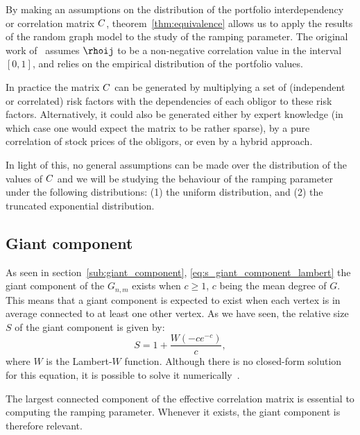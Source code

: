 \vspace{0.5cm}

By making an assumptions on the distribution of the portfolio interdependency or correlation matrix $C$, theorem~\vref{thm:equivalence} allows us to apply the results of the random graph model to the study of the ramping parameter.
The original work of~\cite{Sindel:2009vd} assumes $\rhoij$ to be a non-negative correlation value in the interval $[0,1]$, and relies on the empirical distribution of the portfolio values.

In practice the matrix $C$ can be generated by multiplying a set of (independent or correlated) risk factors with the dependencies of each obligor to these risk factors.
Alternatively, it could also be generated either by expert knowledge (in which case one would expect the matrix to be rather sparse), by a pure correlation of stock prices of the obligors, or even by a hybrid approach.

In light of this, no general assumptions can be made over the distribution of the values of $C$ and we will be studying the behaviour of the ramping parameter under the following distributions:
(1) the uniform distribution, and (2) the truncated exponential distribution.

\subsection{Giant component} %
\label{sub:giant_component}

As seen in section~\vref{sub:giant_component}, \vref{eq:s_giant_component_lambert} the giant component of the $G_{n,m}$ exists when $c \ge 1$, $c$ being the mean degree of $G$.
This means that a giant component is expected to exist when each vertex is in average connected to at least one other vertex.
As we have seen, the relative size $S$ of the giant component is given by:
\begin{equation}
	S = 1 + \frac{W(-c e^{-c})}{c},
\end{equation}
\noindent where $W$ is the Lambert-$W$ function.
Although there is no closed-form solution for this equation, it is possible to solve it numerically~\cite{}.

The largest connected component of the effective correlation matrix is essential to computing the ramping parameter.
Whenever it exists, the giant component is therefore relevant.

